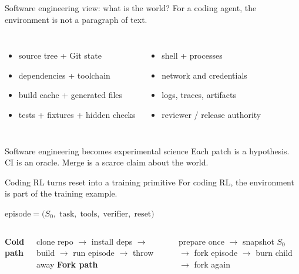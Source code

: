 \begin{frame}{Software engineering view: what is the world?}
\large
For a coding agent, the environment is not a paragraph of text.
\vspace{0.5em}
\begin{columns}[T,onlytextwidth]
\begin{itemize}
  \item source tree + Git state
  \item dependencies + toolchain
  \item build cache + generated files
  \item tests + fixtures + hidden checks
\end{itemize}
\begin{itemize}
  \item shell + processes
  \item network and credentials
  \item logs, traces, artifacts
  \item reviewer / release authority
\end{itemize}
\end{columns}
\vspace{0.6em}
\begin{block}{Software engineering becomes experimental science}
Each patch is a hypothesis. CI is an oracle. Merge is a scarce claim about the world.
\end{block}
\end{frame}

\begin{frame}{Coding RL turns reset into a training primitive}
\large
For coding RL, the environment is part of the training example.
\vspace{0.3em}
\begin{center}
\Large
$\text{episode}=\big(S_0,\;\text{task},\;\text{tools},\;\text{verifier},\;\text{reset}\big)$
\end{center}
\vspace{0.4em}
\begin{columns}[T,onlytextwidth]
\textbf{Cold path}\par
\normalsize clone repo $\rightarrow$ install deps $\rightarrow$ build $\rightarrow$ run episode $\rightarrow$ throw away
\vspace{0.5em}
\textbf{Fork path}\par
\normalsize prepare once $\rightarrow$ snapshot $S_0$ $\rightarrow$ fork episode $\rightarrow$ burn child $\rightarrow$ fork again
\vspace{0.5em}
\end{columns}
\end{frame}


